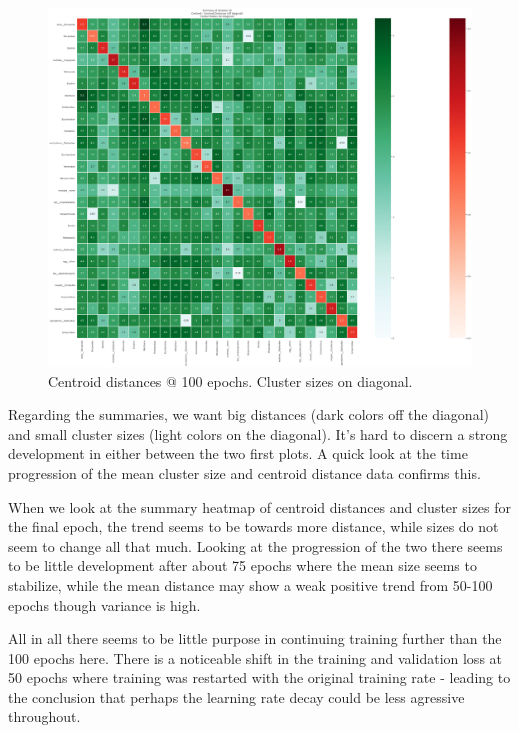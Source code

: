 \documentclass[10pt]{article}
\begin{document}
\begin{figure}
\includegraphics[angle=90, scale=.22]{summarize20.png}
\caption{Centroid distances @ 100 epochs. Cluster sizes on diagonal.}
\end{figure}

Regarding the summaries, we want big distances (dark colors off the diagonal) and small cluster sizes (light colors on the diagonal). It's hard to discern a strong development in either between the two first plots. A quick look at the time progression of the mean cluster size and centroid distance data confirms this. 

When we look at the summary heatmap of centroid distances and cluster sizes for the final epoch, the trend seems to be towards more distance, while sizes do not seem to change all that much. Looking at the progression of the two there seems to be little development after about 75 epochs where the mean size seems to stabilize, while the mean distance may show a weak positive trend from 50-100 epochs though variance is high.

All in all there seems to be little purpose in continuing training further than the 100 epochs here. There is a noticeable shift in the training and validation loss at 50 epochs where training was restarted with the original training rate - leading to the conclusion that perhaps the learning rate decay could be less agressive throughout.
\end{document}
